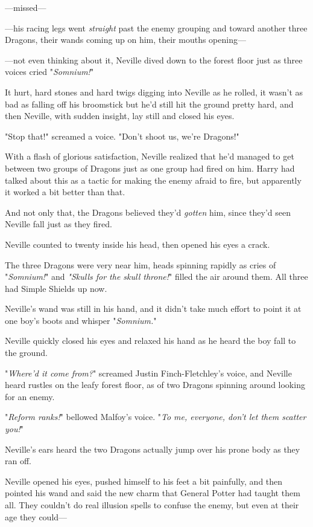 ---missed---

---his racing legs went \emph{straight} past the enemy grouping and toward 
another three Dragons, their wands coming up on him, their mouths opening---

---not even thinking about it, Neville dived down to the forest floor just as 
three voices cried "\emph{Somnium!}"

It hurt, hard stones and hard twigs digging into Neville as he rolled, it 
wasn't as bad as falling off his broomstick but he'd still hit the ground 
pretty hard, and then Neville, with sudden insight, lay still and closed his 
eyes.

"Stop that!" screamed a voice. "Don't shoot us, we're Dragons!"

With a flash of glorious satisfaction, Neville realized that he'd managed to 
get between two groups of Dragons just as one group had fired on him. Harry had 
talked about this as a tactic for making the enemy afraid to fire, but 
apparently it worked a bit better than that.

And not only that, the Dragons believed they'd \emph{gotten} him, since they'd 
seen Neville fall just as they fired.

Neville counted to twenty inside his head, then opened his eyes a crack.

The three Dragons were very near him, heads spinning rapidly as cries of 
"\emph{Somnium!}" and \emph{"Skulls for the skull throne!}" filled the air 
around them. All three had Simple Shields up now.

Neville's wand was still in his hand, and it didn't take much effort to point 
it at one boy's boots and whisper "\emph{Somnium.}"

Neville quickly closed his eyes and relaxed his hand as he heard the boy fall 
to the ground.

"\emph{Where'd it come from?}" screamed Justin Finch-Fletchley's voice, and 
Neville heard rustles on the leafy forest floor, as of two Dragons spinning 
around looking for an enemy.

"\emph{Reform ranks!}" bellowed Malfoy's voice. "\emph{To me, everyone, don't 
let them scatter you!}"

Neville's ears heard the two Dragons actually jump over his prone body as they 
ran off.

Neville opened his eyes, pushed himself to his feet a bit painfully, and then 
pointed his wand and said the new charm that General Potter had taught them 
all. They couldn't do real illusion spells to confuse the enemy, but even at 
their age they could---

